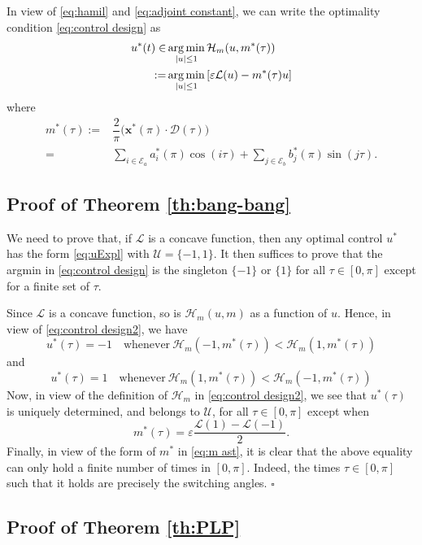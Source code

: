 \documentclass[twocolumn]{autart}    %
\begin{document}
    
    In view of \eqref{eq:hamil} and \eqref{eq:adjoint constant}, we can write the optimality condition \eqref{eq:control design} as
    \begin{align}\label{eq:control design2}
    u^\ast(t)  \in & \operatorname*{arg\,min}_{|u|\leq 1}  \mathcal{H}_m (u, m^\ast(\tau))  \\
     := &\operatorname*{arg\,min}_{|u|\leq 1}   \left[\varepsilon \mathcal{L}(u) - m^\ast(\tau) u \right] \nonumber
    \end{align}    
    where 
    \begin{align}\label{eq:m ast}
    m^\ast (\tau) := & \dfrac 2\pi \big(\bm{x}^*(\pi) \cdot \bm{\mathcal{D}}(\tau)\big) \\
    = & \sum_{i \in \mathcal{E}_a} a^*_i (\pi) \cos(i\tau) + \sum_{j \in \mathcal{E}_b} b^*_j (\pi) \sin(j\tau). \nonumber
    \end{align}


\subsection{Proof of Theorem \ref{th:bang-bang}}\label{proof:bang-bang}

We need to prove that, if $\mathcal{L}$ is a concave function, then any optimal control $u^\ast$ has the form \eqref{eq:uExpl} with $\mathcal{U}=\{-1,1\}$.
It then suffices to prove that the argmin in  \eqref{eq:control design} is the singleton $\{-1\}$ or $\{1\}$ for all $\tau\in [0,\pi]$ except for a finite set of $\tau$.

Since $\mathcal{L}$ is a concave function, so is $\mathcal{H}_m (u, m)$ as a function of $u$. Hence, in view of \eqref{eq:control design2}, we have
$$
u^\ast (\tau)=
-1  \quad \text{whenever} \ \mathcal{H}_m(-1,m^\ast(\tau)) <  \mathcal{H}_m(1,m^\ast(\tau)) 
$$
and
$$
u^\ast (\tau)=
1  \quad \text{whenever} \ \mathcal{H}_m(1,m^\ast(\tau)) <  \mathcal{H}_m(-1,m^\ast(\tau)) 
$$
Now, in view of the definition of $\mathcal{H}_m$ in \eqref{eq:control design2}, we see that $u^\ast(\tau)$ is uniquely determined, and belongs to $\mathcal{U}$, for all $\tau\in [0,\pi]$ except when
$$
m^\ast (\tau) = \varepsilon \dfrac{\mathcal{L}(1) - \mathcal{L}(-1)}{2}.
$$
Finally, in view of the form of $m^\ast$ in \eqref{eq:m ast},   it is clear that the above equality can only hold a finite number of times in $[0,\pi]$.
Indeed,  the times $\tau\in [0,\pi]$ such that it holds are precisely the switching angles. \hfill $\square$


\subsection{Proof of Theorem \ref{th:PLP}}\label{proof:PLP}
\end{document}
